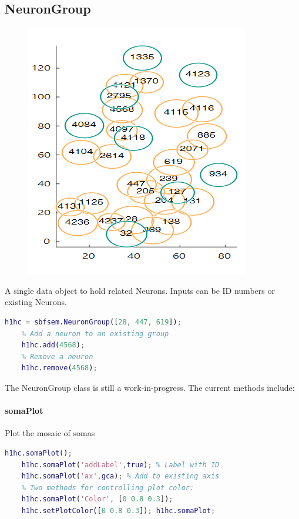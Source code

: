 \documentclass[12pt]{exam}
\begin{document}
	\subsection{NeuronGroup} 
	\begin{figure}
		\includegraphics[width=\linewidth]{h1h2mosaic}
	\end{figure}
	A single data object to hold related Neurons. Inputs can be ID numbers or existing Neurons.
	\begin{lstlisting}[language=matlab]
	h1hc = sbfsem.NeuronGroup([28, 447, 619]);
	% Add a neuron to an existing group
	h1hc.add(4568);
	% Remove a neuron
	h1hc.remove(4568);\end{lstlisting} 
	The NeuronGroup class is still a work-in-progress. The current methods include:
	
	\paragraph{somaPlot} Plot the mosaic of somas
	\begin{lstlisting}[language=matlab]
	h1hc.somaPlot();
	h1hc.somaPlot('addLabel',true); % Label with ID
	h1hc.somaPlot('ax',gca); % Add to existing axis
	% Two methods for controlling plot color:
	h1hc.somaPlot('Color', [0 0.8 0.3]);
	h1hc.setPlotColor([0 0.8 0.3]); h1hc.somaPlot;\end{lstlisting}
\end{document}

